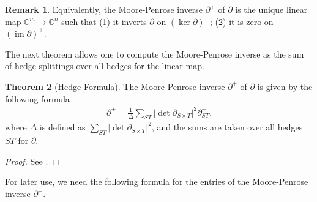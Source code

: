 \documentclass[11pt,reqno]{amsart}
\def\im {{\operatorname{im}}}
\def\C {{\mathbb C}}
\theoremstyle{definition}
\newtheorem{theorem}{Theorem}[section]
\newtheorem{remark}[theorem]{Remark}
\numberwithin{equation}{section}
\begin{document}
\begin{remark}
    Equivalently, the Moore-Penrose inverse $\partial^+$ of $\partial$ is the unique linear map $\C^m\rightarrow\C^n$ such that (1) it inverts $\partial$ on $(\ker \partial)^{\perp}$; (2) it is zero on $(\im \partial)^{\perp}$.
\end{remark}

\smallskip


The next theorem allows one to compute the Moore-Penrose inverse as the sum of hedge splittings over all hedges for the linear map.

\smallskip


\begin{theorem}[Hedge Formula]
    The Moore-Penrose inverse $\partial^+$ of $\partial$ is given by the following formula
    \begin{align*}
        \partial^+ = \frac{1}{\Delta}\sum_{ST}|\det\partial_{S\times T}|^2 \partial_{ST}^+.
    \end{align*}
    where $\Delta$ is defined as $\sum_{ST}|\det\partial_{S\times T}|^2$, and the sums are taken over all hedges $ST$ for $\partial$.
\end{theorem}
\begin{proof}
    See \cite[Corollary 5.9]{EMO}.
\end{proof}

For later use, we need the following formula for the entries of the Moore-Penrose inverse $\partial^+$.
\end{document}
